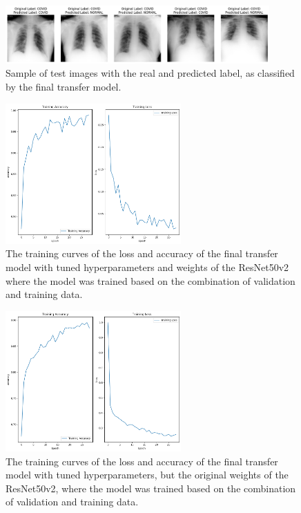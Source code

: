 \documentclass[conference]{IEEEtran}
\begin{document}
\begin{figure}[h] \centering \includegraphics[width=0.9\textwidth]{fig_task3_examples_images_label_vs_predictedlabel.png} 
	\caption{Sample of test images with the real and predicted label, as classified by the final transfer model.} 
	\label{fig:task3_image_examples} 
\end{figure}


\begin{figure}[h] \centering \includegraphics[width=0.6\textwidth]{fig_task3_training_curves_train_model_finetuned_resnet.png} 
	\caption{The training curves of the loss and accuracy of the final transfer model with tuned hyperparameters and weights of the ResNet50v2 where the model was trained based on the combination of validation and training data.} 
	\label{fig:task3_curves_final_resnet} 
\end{figure}

\begin{figure}[h] \centering \includegraphics[width=0.6\textwidth]{fig_task3_training_curves_train_model_tuned_hyperparameters.png} 
	\caption{The training curves of the loss and accuracy of the final transfer model with tuned hyperparameters, but the original weights of the ResNet50v2, where the model was trained based on the combination of validation and training data.} 
	\label{fig:task3_curves_final_hyperparams} 
\end{figure}
\end{document}
